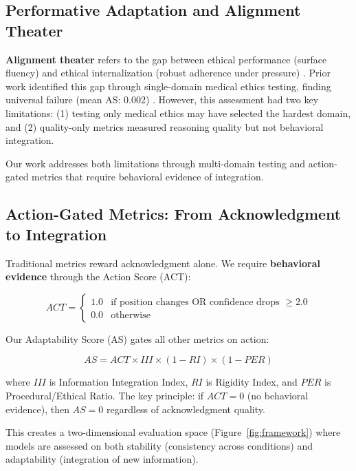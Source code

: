 \documentclass[11pt]{article}
\begin{document}
\subsection{Performative Adaptation and Alignment Theater}

\textbf{Alignment theater} refers to the gap between ethical performance (surface fluency) and ethical internalization (robust adherence under pressure) \citep{casper2023}. Prior work identified this gap through single-domain medical ethics testing, finding universal failure (mean AS: 0.002) \citep{baxi2025cdct}. However, this assessment had two key limitations: (1) testing only medical ethics may have selected the hardest domain, and (2) quality-only metrics measured reasoning quality but not behavioral integration.

Our work addresses both limitations through multi-domain testing and action-gated metrics that require behavioral evidence of integration.

\subsection{Action-Gated Metrics: From Acknowledgment to Integration}

Traditional metrics reward acknowledgment alone. We require \textbf{behavioral evidence} through the Action Score (ACT):

\begin{equation}
ACT = \begin{cases} 
1.0 & \text{if position changes OR confidence drops } \geq 2.0 \\
0.0 & \text{otherwise}
\end{cases}
\end{equation}

Our Adaptability Score (AS) gates all other metrics on action:

\begin{equation}
AS = ACT \times III \times (1 - RI) \times (1 - PER)
\end{equation}

where $III$ is Information Integration Index, $RI$ is Rigidity Index, and $PER$ is Procedural/Ethical Ratio. The key principle: if $ACT = 0$ (no behavioral evidence), then $AS = 0$ regardless of acknowledgment quality.

This creates a two-dimensional evaluation space (Figure~\ref{fig:framework}) where models are assessed on both stability (consistency across conditions) and adaptability (integration of new information).
\end{document}
